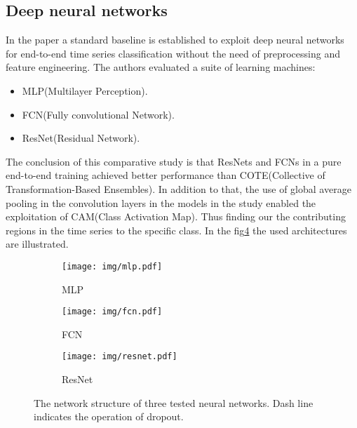\subsection{Deep neural networks}
In the paper \cite{yang2019time} a standard baseline is established to exploit deep neural networks for end-to-end time series classification without the need of preprocessing and feature engineering. The authors evaluated a suite of learning machines:
\begin{itemize}
	\item MLP(Multilayer Perception).
	\item FCN(Fully convolutional Network).
	\item ResNet(Residual Network).
\end{itemize}
The conclusion of this comparative study is that ResNets and FCNs in a pure end-to-end training achieved better performance than COTE(Collective of Transformation-Based Ensembles)\cite{2015TSClassificationCOTE}. In addition to that, the use of global average pooling in the convolution layers in the models in the study enabled the exploitation of CAM(Class Activation Map). Thus finding our the contributing regions in the time series to the specific class\cite{wang2017time}. In the fig\ref{fig:wang2017time} the used architectures are illustrated.
\begin{figure}
	\centering
	\begin{subfigure}[b]{0.25\textwidth}
		\centering
		\texttt{[image: img/mlp.pdf]}
		\caption{MLP}
		\label{fig:wang2017timemlp}
	\end{subfigure}
	\hfill
	\begin{subfigure}[b]{0.25\textwidth}
		\centering
		\texttt{[image: img/fcn.pdf]}
		\caption{FCN}
		\label{fig:wang2017timefcn}
	\end{subfigure}
	\hfill
	\begin{subfigure}[b]{0.3\textwidth}
		\centering
		\texttt{[image: img/resnet.pdf]}
		\caption{ResNet}
		\label{fig:wang2017timeresnet}
	\end{subfigure}
	\caption{The network structure of three tested neural networks. Dash line indicates the operation of dropout\cite{wang2017time}.}
	\label{fig:wang2017time}
\end{figure}
